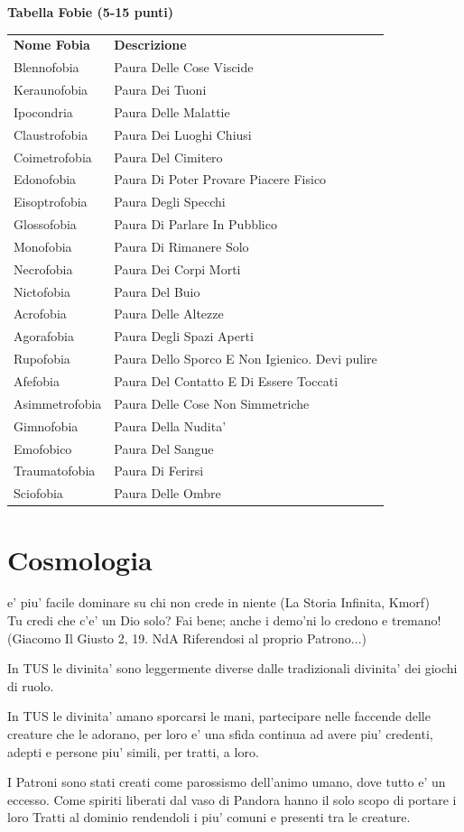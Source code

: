 \documentclass[a4paper,11pt,twoside,openany]{dndbook}
\begin{document}
{\textbf{Tabella Fobie (5-15 punti)}

\begin{tabular}[c]{@{}ll@{}}
\toprule 
\textbf{Nome Fobia} & \textbf{Descrizione}\tabularnewline
Blennofobia & Paura Delle Cose Viscide\tabularnewline
Keraunofobia & Paura Dei Tuoni\tabularnewline
Ipocondria & Paura Delle Malattie\tabularnewline
Claustrofobia & Paura Dei Luoghi Chiusi\tabularnewline
Coimetrofobia & Paura Del Cimitero\tabularnewline
Edonofobia & Paura Di Poter Provare Piacere Fisico\tabularnewline
Eisoptrofobia & Paura Degli Specchi\tabularnewline
Glossofobia & Paura Di Parlare In Pubblico\tabularnewline
Monofobia & Paura Di Rimanere Solo\tabularnewline
Necrofobia & Paura Dei Corpi Morti\tabularnewline
Nictofobia & Paura Del Buio\tabularnewline
Acrofobia & Paura Delle Altezze\tabularnewline
Agorafobia & Paura Degli Spazi Aperti\tabularnewline
Rupofobia & Paura Dello Sporco E Non Igienico. Devi pulire\tabularnewline
Afefobia & Paura Del Contatto E Di Essere Toccati\tabularnewline
Asimmetrofobia & Paura Delle Cose Non Simmetriche\tabularnewline
Gimnofobia & Paura Della Nudita'\tabularnewline
Emofobico & Paura Del Sangue\tabularnewline
Traumatofobia & Paura Di Ferirsi\tabularnewline
Sciofobia & Paura Delle Ombre\tabularnewline
\bottomrule
\end{tabular}

\pagebreak

\section{Cosmologia}

\label{cosmologia}
\begin{quotebox}
e' piu' facile dominare su chi non crede in niente (La Storia Infinita, Kmorf)\\
Tu credi che c'e' un Dio solo? Fai bene; anche i demo'ni lo credono e tremano! (Giacomo Il Giusto 2, 19. NdA Riferendosi al proprio Patrono...)
\end{quotebox}

In TUS le divinita' sono leggermente diverse dalle tradizionali divinita' dei giochi di ruolo.

In TUS le divinita' amano sporcarsi le mani, partecipare nelle faccende delle creature che le adorano, per loro e' una sfida continua ad avere piu' credenti, adepti e persone piu' simili, per tratti, a loro.

I Patroni sono stati creati come parossismo dell'animo umano, dove tutto e' un eccesso. Come spiriti liberati dal vaso di Pandora hanno il solo scopo di portare i loro Tratti al dominio rendendoli i piu' comuni e presenti tra le creature.

}
\end{document}
